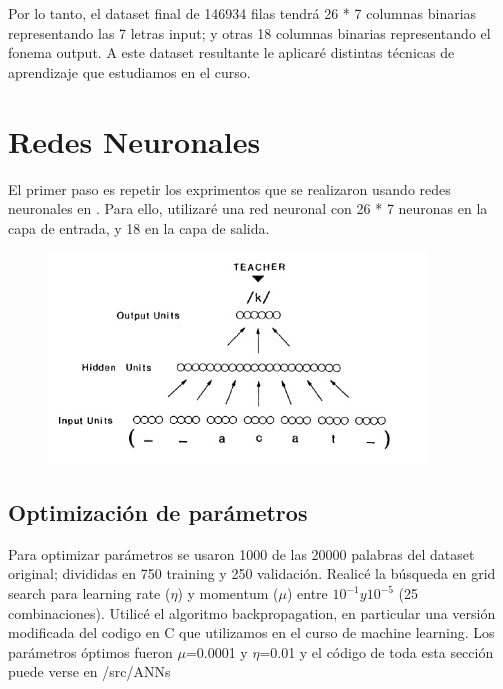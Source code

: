 \documentclass[paper=a4, fontsize=11pt]{scrartcl} %
\numberwithin{equation}{section} %
\numberwithin{figure}{section} %
\numberwithin{table}{section} %
\begin{document}
Por lo tanto, el dataset final de 146934 filas tendrá 26 * 7 columnas binarias representando las 7 letras input; y otras 18 columnas binarias representando el fonema output. A este dataset resultante le aplicaré distintas técnicas de aprendizaje que estudiamos en el curso.

\section{Redes Neuronales}
El primer paso es repetir los exprimentos que se realizaron usando redes neuronales en \cite{parallel}. Para ello, utilizaré una red neuronal con 26 * 7 neuronas en la capa de entrada, y 18 en la capa de salida. 

\begin{figure}[h!]
\centering
\includegraphics[width=100mm]{figure1.jpg}
\end{figure}


\subsection{Optimización de parámetros}

Para optimizar parámetros se usaron 1000 de las 20000 palabras del dataset original; divididas en 750 training y 250 validación. Realicé la búsqueda en grid search para learning rate ($\eta$) y momentum ($\mu$) entre  $10^{-1} y 10^{-5}$ (25 combinaciones). Utilicé el algoritmo backpropagation, en particular una versión modificada del codigo en C que utilizamos en el curso de machine learning. Los parámetros óptimos fueron $\mu$=0.0001 y $\eta$=0.01 y el código de toda esta sección puede verse en /src/ANNs

\end{document}
